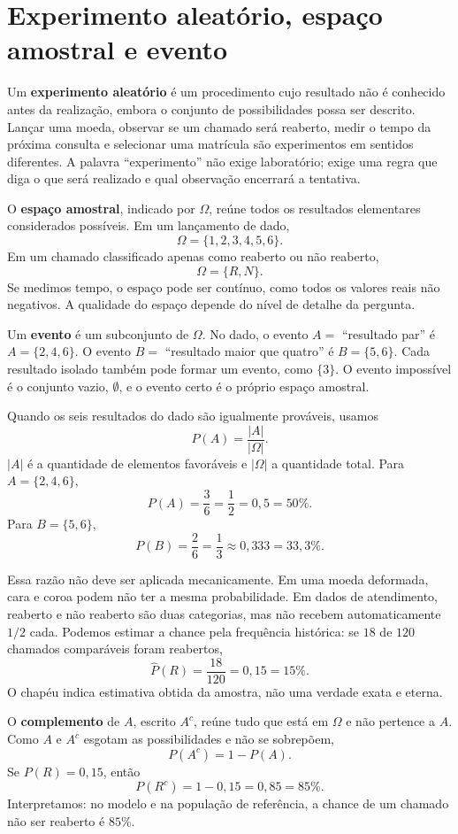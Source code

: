 \section{Experimento aleatório, espaço amostral e evento}

Um \textbf{experimento aleatório} é um procedimento cujo resultado não é conhecido antes da realização, embora o conjunto de possibilidades possa ser descrito. Lançar uma moeda, observar se um chamado será reaberto, medir o tempo da próxima consulta e selecionar uma matrícula são experimentos em sentidos diferentes. A palavra ``experimento'' não exige laboratório; exige uma regra que diga o que será realizado e qual observação encerrará a tentativa.

O \textbf{espaço amostral}, indicado por $\Omega$, reúne todos os resultados elementares considerados possíveis. Em um lançamento de dado,
\[
\Omega=\{1,2,3,4,5,6\}.
\]
Em um chamado classificado apenas como reaberto ou não reaberto,
\[
\Omega=\{R,N\}.
\]
Se medimos tempo, o espaço pode ser contínuo, como todos os valores reais não negativos. A qualidade do espaço depende do nível de detalhe da pergunta.

Um \textbf{evento} é um subconjunto de $\Omega$. No dado, o evento $A=$ ``resultado par'' é $A=\{2,4,6\}$. O evento $B=$ ``resultado maior que quatro'' é $B=\{5,6\}$. Cada resultado isolado também pode formar um evento, como $\{3\}$. O evento impossível é o conjunto vazio, $\emptyset$, e o evento certo é o próprio espaço amostral.

Quando os seis resultados do dado são igualmente prováveis, usamos
\[
P(A)=\frac{|A|}{|\Omega|}.
\]
$|A|$ é a quantidade de elementos favoráveis e $|\Omega|$ a quantidade total. Para $A=\{2,4,6\}$,
\[
P(A)=\frac{3}{6}=\frac{1}{2}=0{,}5=50\%.
\]
Para $B=\{5,6\}$,
\[
P(B)=\frac{2}{6}=\frac{1}{3}\approx0{,}333=33{,}3\%.
\]

Essa razão não deve ser aplicada mecanicamente. Em uma moeda deformada, cara e coroa podem não ter a mesma probabilidade. Em dados de atendimento, reaberto e não reaberto são duas categorias, mas não recebem automaticamente $1/2$ cada. Podemos estimar a chance pela frequência histórica: se $18$ de $120$ chamados comparáveis foram reabertos,
\[
\widehat{P}(R)=\frac{18}{120}=0{,}15=15\%.
\]
O chapéu indica estimativa obtida da amostra, não uma verdade exata e eterna.

O \textbf{complemento} de $A$, escrito $A^c$, reúne tudo que está em $\Omega$ e não pertence a $A$. Como $A$ e $A^c$ esgotam as possibilidades e não se sobrepõem,
\[
P(A^c)=1-P(A).
\]
Se $P(R)=0{,}15$, então
\[
P(R^c)=1-0{,}15=0{,}85=85\%.
\]
Interpretamos: no modelo e na população de referência, a chance de um chamado não ser reaberto é $85\%$.

